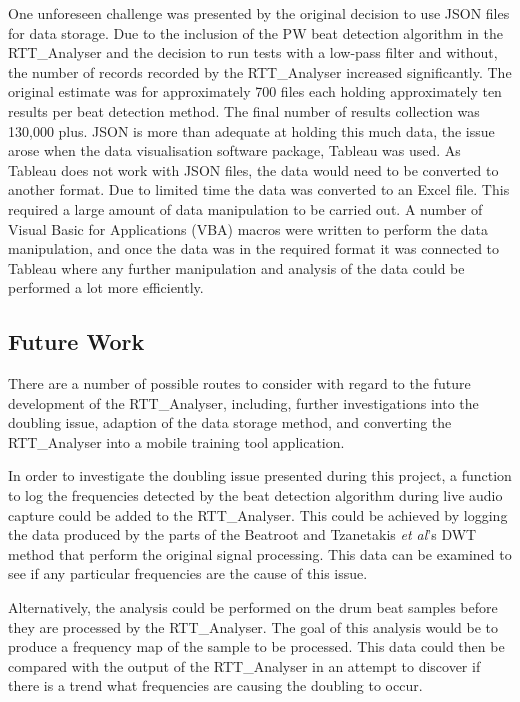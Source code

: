 \documentclass[a4paper, 11pt]{article}
\begin{document}
One unforeseen challenge was presented by the original decision to use JSON files for data storage. Due to the inclusion of the PW beat detection algorithm in the RTT\_Analyser and the decision to run tests with a low-pass filter and without, the number of records recorded by the RTT\_Analyser increased significantly. The original estimate was for approximately 700 files each holding approximately ten results per beat detection method. The final number of results collection was 130,000 plus. JSON is more than adequate at holding this much data, the issue arose when the data visualisation software package, Tableau\cite{tableau} was used. As Tableau does not work with JSON files, the data would need to be converted to another format. Due to limited time the data was converted to an Excel\cite{excel} file. This required a large amount of data manipulation to be carried out. A number of Visual Basic for Applications (VBA) macros were written to perform the data manipulation, and once the data was in the required format it was connected to Tableau where any further manipulation and analysis of the data could be performed a lot more efficiently. 

\subsection{Future Work}
There are a number of possible routes to consider with regard to the future development of the RTT\_Analyser, including, further investigations into the doubling issue, adaption of the data storage method, and converting the RTT\_Analyser into a mobile training tool application.\par

In order to investigate the doubling issue presented during this project, a function to log the frequencies detected by the beat detection algorithm during live audio capture could be added to the RTT\_Analyser. This could be achieved by logging the data produced by the parts of the Beatroot and Tzanetakis \textit{et al}'s \cite{tzane1} DWT method that perform the original signal processing. This data can be examined to see if any particular frequencies are the cause of this issue.\par

Alternatively, the analysis could be performed on the drum beat samples before they are processed by the RTT\_Analyser. The goal of this analysis would be to produce a frequency map of the sample to be processed. This data could then be compared with the output of the RTT\_Analyser in an attempt to discover if there is a trend what frequencies are causing the doubling to occur.\par
\end{document}
